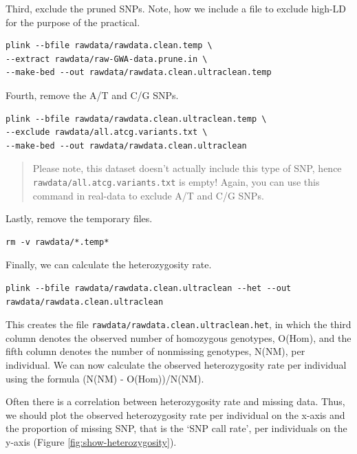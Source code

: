 \documentclass[
]{book}
\begin{document}
Third, exclude the pruned SNPs. Note, how we include a file to exclude high-LD for the purpose of the practical.

\begin{verbatim}
plink --bfile rawdata/rawdata.clean.temp \
--extract rawdata/raw-GWA-data.prune.in \
--make-bed --out rawdata/rawdata.clean.ultraclean.temp
\end{verbatim}

Fourth, remove the A/T and C/G SNPs.

\begin{verbatim}
plink --bfile rawdata/rawdata.clean.ultraclean.temp \
--exclude rawdata/all.atcg.variants.txt \
--make-bed --out rawdata/rawdata.clean.ultraclean
\end{verbatim}

\begin{quote}
Please note, this dataset doesn't actually include this type of SNP, hence \texttt{rawdata/all.atcg.variants.txt} is empty! Again, you can use this command in real-data to exclude A/T and C/G SNPs.
\end{quote}

Lastly, remove the temporary files.

\begin{verbatim}
rm -v rawdata/*.temp*
\end{verbatim}

Finally, we can calculate the heterozygosity rate.

\begin{verbatim}
plink --bfile rawdata/rawdata.clean.ultraclean --het --out rawdata/rawdata.clean.ultraclean
\end{verbatim}

This creates the file \texttt{rawdata/rawdata.clean.ultraclean.het}, in which the third column denotes the observed number of homozygous genotypes, O(Hom), and the fifth column denotes the number of nonmissing genotypes, N(NM), per individual. We can now calculate the observed heterozygosity rate per individual using the formula (N(NM) - O(Hom))/N(NM).

Often there is a correlation between heterozygosity rate and missing data. Thus, we should plot the observed heterozygosity rate per individual on the x-axis and the proportion of missing SNP, that is the `SNP call rate', per individuals on the y-axis (Figure \ref{fig:show-heterozygosity}).
\end{document}

